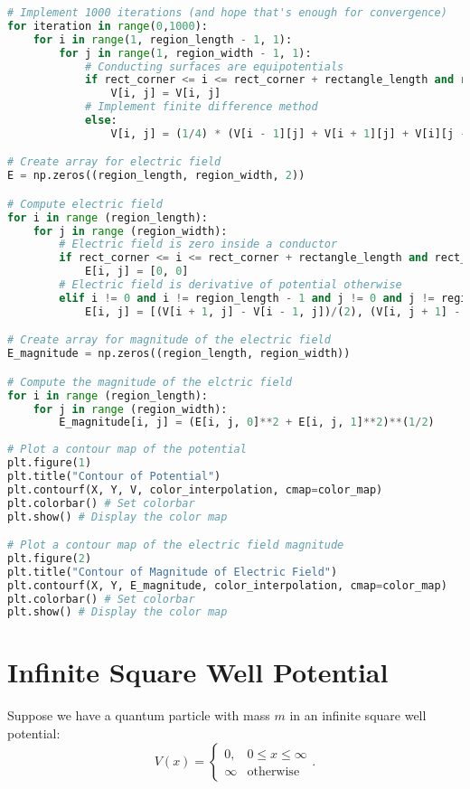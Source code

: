 \documentclass{article}
\numberwithin{equation}{section}
\begin{document}
\begin{lstlisting}[language=Python]
# Implement 1000 iterations (and hope that's enough for convergence)
for iteration in range(0,1000):
    for i in range(1, region_length - 1, 1):
        for j in range(1, region_width - 1, 1):
            # Conducting surfaces are equipotentials
            if rect_corner <= i <= rect_corner + rectangle_length and rect_corner <= j <= rect_corner + rectangle_width:
                V[i, j] = V[i, j]
            # Implement finite difference method                
            else:
                V[i, j] = (1/4) * (V[i - 1][j] + V[i + 1][j] + V[i][j - 1] + V[i][j + 1])

# Create array for electric field
E = np.zeros((region_length, region_width, 2))

# Compute electric field
for i in range (region_length):
    for j in range (region_width):
        # Electric field is zero inside a conductor
        if rect_corner <= i <= rect_corner + rectangle_length and rect_corner <= j <= rect_corner + rectangle_width:
            E[i, j] = [0, 0]
        # Electric field is derivative of potential otherwise
        elif i != 0 and i != region_length - 1 and j != 0 and j != region_width - 1:
            E[i, j] = [(V[i + 1, j] - V[i - 1, j])/(2), (V[i, j + 1] - V[i, j - 1])/(2)]

# Create array for magnitude of the electric field
E_magnitude = np.zeros((region_length, region_width))

# Compute the magnitude of the elctric field
for i in range (region_length):
    for j in range (region_width):
        E_magnitude[i, j] = (E[i, j, 0]**2 + E[i, j, 1]**2)**(1/2)
        
# Plot a contour map of the potential
plt.figure(1)
plt.title("Contour of Potential")
plt.contourf(X, Y, V, color_interpolation, cmap=color_map)
plt.colorbar() # Set colorbar
plt.show() # Display the color map

# Plot a contour map of the electric field magnitude
plt.figure(2)
plt.title("Contour of Magnitude of Electric Field")
plt.contourf(X, Y, E_magnitude, color_interpolation, cmap=color_map)
plt.colorbar() # Set colorbar
plt.show() # Display the color map
\end{lstlisting}

\section{Infinite Square Well Potential}

Suppose we have a quantum particle with mass $m$ in an infinite square well potential:
\begin{equation*}
    V(x) = \begin{cases} 0, & 0 \leqslant x \leqslant \infty \\ \infty & \text{otherwise} \end{cases}.
\end{equation*}
\end{document}
